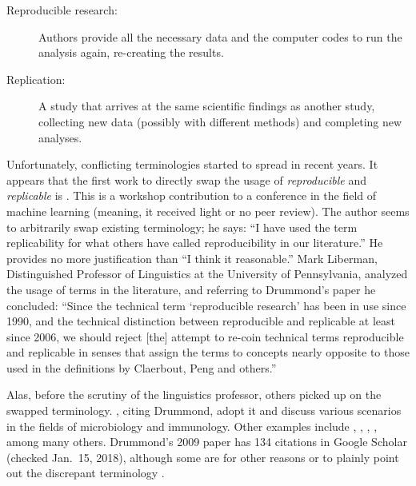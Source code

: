 \documentclass{statement}
\newlength{\up}
\begin{document}
\begin{description}
\item[Reproducible research:] Authors provide all the necessary data and the computer codes to run the analysis again, re-creating the results.
\item[Replication:] A study that arrives at the same scientific findings as another study, collecting new data (possibly with different methods) and completing new analyses.
\end{description}

Unfortunately, conflicting terminologies started to spread in recent years. 
It appears that the first work to directly swap the usage of \emph{reproducible} and \emph{replicable} is \cite{drummond2009}. 
This is a workshop contribution to a conference in the field of machine learning (meaning, it received light or no peer review). 
The author seems to arbitrarily swap existing terminology; he says: ``I have used the term replicability for what others have called reproducibility in our literature.''
He provides no more justification than ``I think it reasonable.''
Mark Liberman, Distinguished Professor of Linguistics at the University of Pennsylvania, analyzed the usage of terms in the literature, and referring to Drummond's paper he concluded: ``Since the technical term `reproducible research' has been in use since 1990, and the technical distinction between reproducible and replicable at least since 2006, we should reject [the] attempt to re-coin technical terms reproducible and replicable in senses that assign the terms to concepts nearly opposite to those used in the definitions by Claerbout, Peng and others.'' \cite[]{liberman2015}

Alas, before the scrutiny of the linguistics professor, others picked up on the swapped terminology. 
\cite{casadevall_fang2010}, citing Drummond, adopt it and discuss various scenarios in the fields of microbiology and immunology. 
Other examples include \cite{davison2012}, \cite{loscalzo2012}, \cite{crook2013}, \cite{cooper2015}, among many others. 
Drummond's 2009 paper has 134 citations in Google Scholar (checked Jan.\ 15, 2018), although some are for other reasons \cite[]{dewinter_happee2013} or to plainly point out the discrepant terminology \cite[]{boylan2015}.
\end{document}
